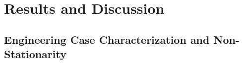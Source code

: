 
%
%


\section{Results and Discussion}
\label{sec:results_discussion}

\subsection{Engineering Case Characterization and Non-Stationarity}
\label{subsec:industrial_data_analysis}

